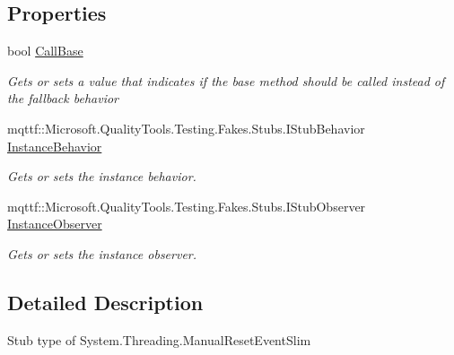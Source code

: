 \subsection*{Properties}
\begin{DoxyCompactItemize}
\item 
bool \hyperlink{class_system_1_1_threading_1_1_fakes_1_1_stub_manual_reset_event_slim_a001d97b9d2ddd03a1e4f9caac904be93}{Call\-Base}
\begin{DoxyCompactList}\small\item\em Gets or sets a value that indicates if the base method should be called instead of the fallback behavior\end{DoxyCompactList}\item 
mqttf\-::\-Microsoft.\-Quality\-Tools.\-Testing.\-Fakes.\-Stubs.\-I\-Stub\-Behavior \hyperlink{class_system_1_1_threading_1_1_fakes_1_1_stub_manual_reset_event_slim_a329bc7f0e96f104c8a51ffd321325462}{Instance\-Behavior}
\begin{DoxyCompactList}\small\item\em Gets or sets the instance behavior.\end{DoxyCompactList}\item 
mqttf\-::\-Microsoft.\-Quality\-Tools.\-Testing.\-Fakes.\-Stubs.\-I\-Stub\-Observer \hyperlink{class_system_1_1_threading_1_1_fakes_1_1_stub_manual_reset_event_slim_a80d45e81bd538cdcdb881f2484528297}{Instance\-Observer}
\begin{DoxyCompactList}\small\item\em Gets or sets the instance observer.\end{DoxyCompactList}\end{DoxyCompactItemize}


\subsection{Detailed Description}
Stub type of System.\-Threading.\-Manual\-Reset\-Event\-Slim



